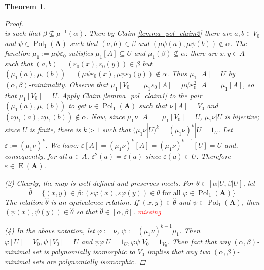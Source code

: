 \documentclass{amsart}
\theoremstyle{plain}
\newtheorem{theorem}{Theorem}[section]
\theoremstyle{definition}
\theoremstyle{remark}
\def\phi{\varphi}
\def\epsilon{\varepsilon}
\DeclareMathOperator{\Pol}{Pol}
\DeclareMathOperator{\Id}{E}
\begin{document}
\begin{theorem}
\begin{proof}
\begin{equation*}
        \end{equation*}
        is such that $\beta \nsubseteq \mu^{-1}(\alpha)$. 
        Then by Claim \ref{lemma_pol_claim2} there are $a,b \in V_0$ and $\psi \in \Pol_1(\mathbf{A})$ such that $(a,b) \in \beta$ and $(\mu \psi(a), \mu \psi(b)) \notin \alpha$. 
        The function $\mu_1:=\mu \psi \epsilon_0$ satisfies $\mu_1[A] \subseteq U$ and $\mu_1(\beta) \nsubseteq \alpha$: 
        there are $x,y \in A$ such that $(a,b)=(\epsilon_0(x), \epsilon_0(y)) \in \beta $ but $(\mu_1(a), \mu_1(b))=(\mu \psi \epsilon_0(x), \mu \psi \epsilon_0(y)) \notin \alpha$. 
        Thus $\mu_1[A] = U$ by $(\alpha, \beta)$-minimality. 
        Observe that $\mu_1[V_0]=\mu_1 \epsilon_0 [A] = \mu \psi \epsilon^2_0[A] = \mu_1[A]$, so that $\mu_1[V_0] = U$. 
        Apply Claim \ref{lemma_pol_claim1} to the pair $(\mu_1(a), \mu_1(b))$ to get $\nu \in \Pol_1(\mathbf{A})$ such that $\nu[A]=V_0$ and $(\nu \mu_1(a), \nu \mu_1(b)) \notin \alpha$. 
        Now, since $\mu_1 \nu [A] = \mu_1[V_0] = U$, 
        $\mu_1 \nu | U $ is bijective; since $U$ is finite, there is $k >1$ such that $(\mu_1 \nu |U )^k = (\mu_1 \nu)^k |U =1_U$. 
        Let $\epsilon:=(\mu_1 \nu)^k$.
        We have: $\epsilon[A] = (\mu_1 \nu)^k[A]=(\mu_1 \nu)^{k-1}[U]=U$ and, consequently, for all $a \in A$, $\epsilon^2(a)=\epsilon(a)$ since $\epsilon(a) \in U$. 
        Therefore $\epsilon \in \Id(\mathbf{A})$. 

        (2) Clearly, the map is well defined and preserves meets. 
        For $\theta \in [\alpha|U, \beta|U]$, let 
        \begin{equation*}
            \hat{\theta}=\{(x,y) \in \beta : (\epsilon \phi(x), \epsilon \phi(y)) \in \theta \text{ for all } \phi \in \Pol_1(\mathbf{A})\}
        \end{equation*}
        The relation $\hat{\theta}$ is an equivalence relation.
        If $(x,y) \in \hat{\theta}$ and $\psi \in \Pol_1(\mathbf{A})$, then $(\psi(x),\psi(y)) \in \hat{\theta}$ so that $\hat{\theta} \in [\alpha, \beta]$. 
        \textcolor{red}{missing}

        (4) In the above notation, let $\phi:=\nu$, $\psi:=(\mu_1 \nu)^{k-1} \mu_1$. 
        Then $\phi[U] = V_0, \psi[V_0]=U$ and $\psi \phi | U = 1_U, \phi \psi | V_0 = 1_{V_0}$. 
        Then fact that any $(\alpha, \beta)$-minimal set is polynomially isomorphic to $V_0$ implies that any two $(\alpha, \beta)$-minimal sets are polynomially isomorphic. 


\end{proof}
\end{theorem}
\end{document}
